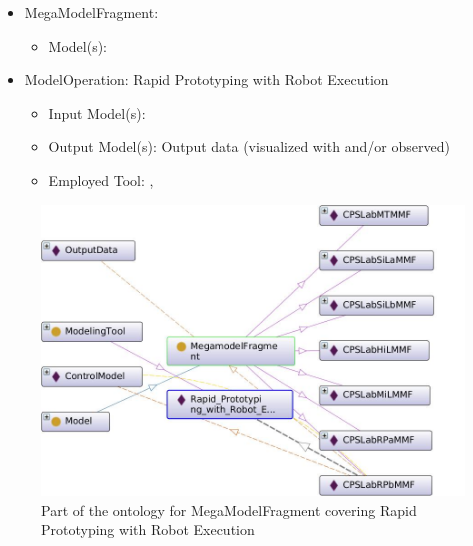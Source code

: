 

\begin{itemize}
    \item MegaModelFragment: \CPSLabRPbMMF
    \begin{itemize}
        \item Model(s): \CPSLabControlModel
    \end{itemize}
\end{itemize}


\begin{itemize}
    \item ModelOperation: Rapid Prototyping with Robot Execution
    \begin{itemize}
        \item Input Model(s): \CPSLabControlModel
        \item Output Model(s): Output data (visualized with \MATLABSimulinkSimulator and/or observed)
        \item Employed Tool: \MATLABSimulinkSimulator, \RobotExecutionRemote %
    \end{itemize}
\end{itemize}

 

\begin{figure}[!htb]
\centering
\includegraphics[scale=0.333]{figures/CPSLabRPbMMF.jpg}
\caption{Part of the ontology for MegaModelFragment \CPSLabRPbMMF covering Rapid Prototyping with Robot Execution}
\label{fig:CPSLabRPbMMF}
\end{figure}


